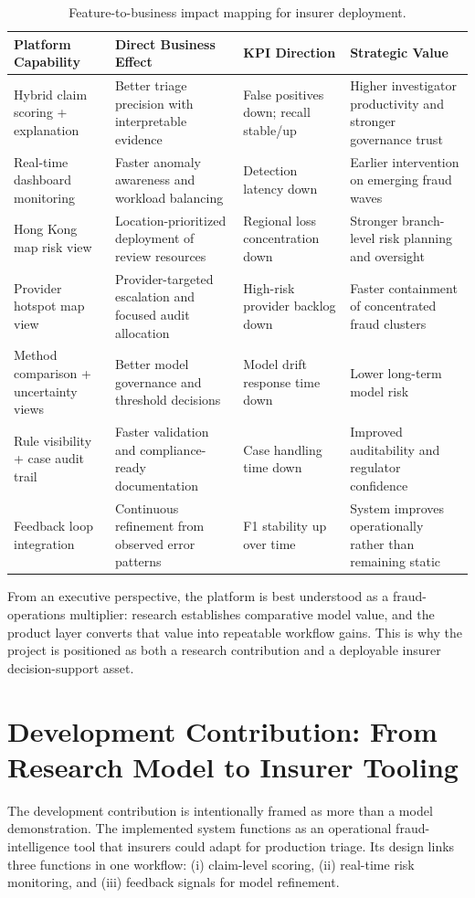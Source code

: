 \documentclass[12pt,a4paper]{report}
\begin{document}
\begin{table}[H]
\caption{Feature-to-business impact mapping for insurer deployment.}
\label{tab:platform_business_impact}
\begin{tabular}{p{}p{}p{}p{}}
\toprule
\textbf{Platform Capability} & \textbf{Direct Business Effect} & \textbf{KPI Direction} & \textbf{Strategic Value} \\
\midrule
Hybrid claim scoring + explanation & Better triage precision with interpretable evidence & False positives down; recall stable/up & Higher investigator productivity and stronger governance trust \\
Real-time dashboard monitoring & Faster anomaly awareness and workload balancing & Detection latency down & Earlier intervention on emerging fraud waves \\
Hong Kong map risk view & Location-prioritized deployment of review resources & Regional loss concentration down & Stronger branch-level risk planning and oversight \\
Provider hotspot map view & Provider-targeted escalation and focused audit allocation & High-risk provider backlog down & Faster containment of concentrated fraud clusters \\
Method comparison + uncertainty views & Better model governance and threshold decisions & Model drift response time down & Lower long-term model risk \\
Rule visibility + case audit trail & Faster validation and compliance-ready documentation & Case handling time down & Improved auditability and regulator confidence \\
Feedback loop integration & Continuous refinement from observed error patterns & F1 stability up over time & System improves operationally rather than remaining static \\
\bottomrule
\end{tabular}
\end{table}

From an executive perspective, the platform is best understood as a fraud-operations multiplier: research establishes comparative model value, and the product layer converts that value into repeatable workflow gains. This is why the project is positioned as both a research contribution and a deployable insurer decision-support asset.

\section{Development Contribution: From Research Model to Insurer Tooling}
The development contribution is intentionally framed as more than a model demonstration. The implemented system functions as an operational fraud-intelligence tool that insurers could adapt for production triage. Its design links three functions in one workflow: (i) claim-level scoring, (ii) real-time risk monitoring, and (iii) feedback signals for model refinement.
\end{document}
